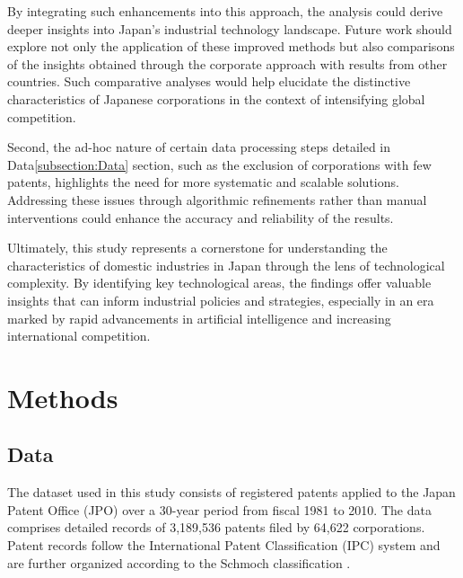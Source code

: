 \documentclass[fleqn,10pt]{wlscirep}
\begin{document}
By integrating such enhancements into this approach, the analysis could derive deeper insights into Japan's industrial technology landscape. 
Future work should explore not only the application of these improved methods but also comparisons of the insights obtained through the corporate approach with results from other countries. Such comparative analyses would help elucidate the distinctive characteristics of Japanese corporations in the context of intensifying global competition.

Second, the ad-hoc nature of certain data processing steps detailed in Data\ref{subsection:Data} section, such as the exclusion of corporations with few patents, highlights the need for more systematic and scalable solutions. Addressing these issues through algorithmic refinements rather than manual interventions could enhance the accuracy and reliability of the results.

Ultimately, this study represents a cornerstone for understanding the characteristics of domestic industries in Japan through the lens of technological complexity. By identifying key technological areas, the findings offer valuable insights that can inform industrial policies and strategies, especially in an era marked by rapid advancements in artificial intelligence and increasing international competition.


\section*{Methods} \label{section:Methods}
\subsection*{Data} \label{subsection:Data}
The dataset used in this study consists of registered patents applied to the Japan Patent Office (JPO) over a 30-year period from fiscal 1981 to 2010. The data comprises detailed records of 3,189,536 patents filed by 64,622 corporations. Patent records follow the International Patent Classification (IPC) system and are further organized according to the Schmoch classification \cite{Schmoch2008}. 
\end{document}
